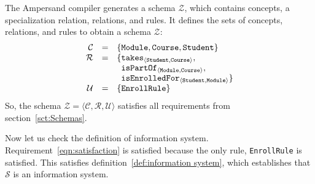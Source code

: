 \documentclass[runningheads]{llncs}
\newcommand{\id}[1]{\text{\it #1\/}}
\newcommand{\maintain}{\mathbin{\id{maint}}}
\newcommand{\declare}[3]{\id{#1}_{\pair{#2}{#3}}}
\newcommand{\pair}[2]{\langle{#1},{#2}\rangle}
\newcommand{\triple}[3]{\langle{#1},{#2},{#3}\rangle}
\newcommand{\concepts}{\mathcal{C}}
\newcommand{\rels}{\mathcal{R}}   %
\newcommand{\rules}{\mathcal{U}}
\newcommand{\roles}{\mathcal{O}}
\newcommand{\dataset}{\mathscr{D}}
\newcommand{\schema}{\mathscr{Z}}
\newcommand{\infsys}{\mathscr{S}}
\newcommand{\isa}{\preceq}
\begin{document}
   The Ampersand compiler generates a schema $\schema$, which contains concepts, a specialization relation, relations, and rules.
   It defines the sets of concepts, relations, and rules to obtain a schema $\schema$:
\[\begin{array}{rcl}
   \concepts&=&\{ {\tt Module}, {\tt Course}, {\tt Student}\}\\
   \rels&=&\{\begin{array}[t]{@{}l@{}}
               \declare{\tt takes}{\tt Student}{\tt Course},\\
               \declare{\tt isPartOf}{\tt Module}{\tt Course},\\
               \declare{\tt isEnrolledFor}{\tt Student}{\tt Module}\}
             \end{array}\\
   \rules&=&\{ {\tt EnrollRule}\}
  \end{array}
\]
   So, the schema $\schema=\triple{\concepts}{\rels}{\rules}$ satisfies all requirements from section~\ref{sct:Schemas}.

   Now let us check the definition of information system.
   Requirement~\ref{eqn:satisfaction} is satisfied because the only rule, {\tt EnrollRule} is satisfied.
   This satisfies definition~\ref{def:information system}, which establishes that $\infsys$ is an information system.

\end{document}
